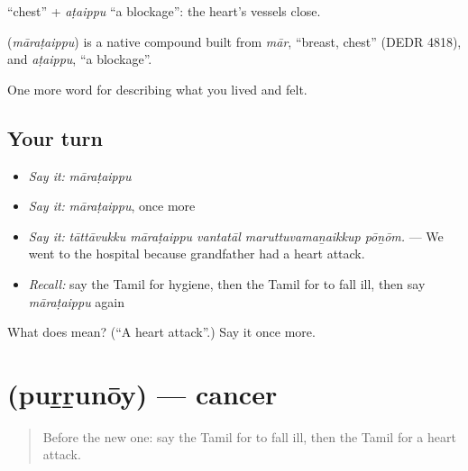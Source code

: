  \textquotedblleft{}chest\textquotedblright{} + \emph{aṭaippu} \textquotedblleft{}a blockage\textquotedblright{}: the heart's vessels close.

\begin{cousinweb}
\textbf{} (\emph{māraṭaippu}) is a native compound built from  \emph{mār}, \textquotedblleft{}breast, chest\textquotedblright{} (DEDR 4818), and \emph{aṭaippu}, \textquotedblleft{}a blockage\textquotedblright{}.
\end{cousinweb}

\begin{grammarlens}[title={What you've built}]
One more word for describing what you lived and felt.
\end{grammarlens}

\subsection*{Your turn}
\begin{itemize}
\raggedright
  \item \emph{Say it:} \emph{māraṭaippu}
  \item \emph{Say it:} \emph{māraṭaippu}, once more
  \item \emph{Say it:} \emph{tāttāvukku māraṭaippu vantatāl maruttuvamaṉaikkup pōṉōm.} — We went to the hospital because grandfather had a heart attack.
  \item \emph{Recall:} say the Tamil for hygiene, then the Tamil for to fall ill, then say \emph{māraṭaippu} again
\end{itemize}

\begin{tcolorbox}[breakable,colback=teal!4,colframe=teal!35!black,title={Before you move on}]
What does  mean? (\textquotedblleft{}A heart attack\textquotedblright{}.) Say it once more.
\end{tcolorbox}
\section[\texorpdfstring{\ta{புற்றுநோய்} (puṟṟunōy)}{புற்றுநோய் (puṟṟunōy)}]{ (puṟṟunōy) — cancer}

\label{lesson:TA-C477-purrunoy}



\begin{quote}
Before the new one: say the Tamil for to fall ill, then the Tamil for a heart attack.
\end{quote}

